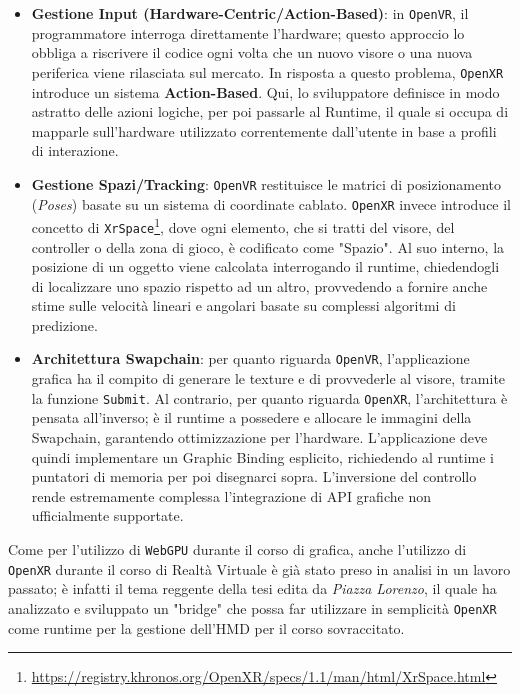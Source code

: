 \documentclass[a4paper, 11pt, twoside]{report}
\begin{document}
\begin{itemize}
    \item \textbf{Gestione Input (Hardware-Centric/Action-Based)}: in \texttt{\gls{OpenVR}}, il programmatore interroga
        direttamente l'hardware; questo approccio lo obbliga a riscrivere il codice ogni volta che un nuovo visore o una
        nuova periferica viene rilasciata sul mercato. In risposta a questo problema, \texttt{\gls{OpenXR}} introduce un
        sistema \textbf{Action-Based}. Qui, lo sviluppatore definisce in modo astratto delle azioni logiche, per poi
        passarle al Runtime, il quale si occupa di mapparle sull'hardware utilizzato correntemente dall'utente in base a
        profili di interazione.
    \item \textbf{Gestione Spazi/Tracking}: \texttt{\gls{OpenVR}} restituisce le matrici di posizionamento (\textit{Poses})
        basate su un sistema di coordinate cablato. \texttt{\gls{OpenXR}} invece introduce il concetto di
        \texttt{XrSpace}\footnote{\url{https://registry.khronos.org/OpenXR/specs/1.1/man/html/XrSpace.html}}, dove ogni
        elemento, che si tratti del visore, del controller o della zona di gioco, è codificato come "Spazio".
        Al suo interno, la posizione di un oggetto viene calcolata interrogando il runtime, chiedendogli di localizzare
        uno spazio rispetto ad un altro, provvedendo a fornire anche stime sulle velocità lineari e angolari basate su
        complessi algoritmi di predizione.
    \item \textbf{Architettura Swapchain}: per quanto riguarda \texttt{\gls{OpenVR}}, l'applicazione grafica ha il
        compito di generare le texture e di provvederle al visore, tramite la funzione \texttt{Submit}. Al contrario,
        per quanto riguarda \texttt{\gls{OpenXR}}, l'architettura è pensata all'inverso; è il runtime a possedere e
        allocare le immagini della Swapchain, garantendo ottimizzazione per l'hardware. L'applicazione deve quindi
        implementare un Graphic Binding esplicito, richiedendo al runtime i puntatori di memoria per poi disegnarci
        sopra. L'inversione del controllo rende estremamente complessa l'integrazione di API grafiche non ufficialmente
        supportate.
\end{itemize}

Come per l'utilizzo di \texttt{WebGPU} durante il corso di grafica, anche l'utilizzo di \texttt{\gls{OpenXR}} durante il
corso di Realtà Virtuale è già stato preso in analisi in un lavoro passato; è infatti il tema reggente della tesi edita
da \textit{Piazza Lorenzo}, il quale ha analizzato e sviluppato un "bridge" che possa far utilizzare in semplicità
\texttt{\gls{OpenXR}} come runtime per la gestione dell'\gls{HMD} per il corso sovraccitato.
\end{document}
